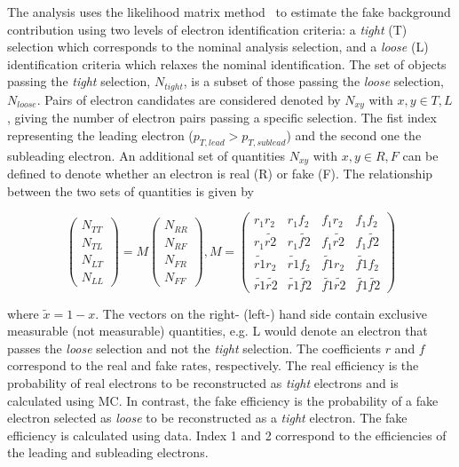 The analysis uses the likelihood matrix method~\cite{Varnes:2016nrb} to estimate the fake background contribution using two levels of electron identification criteria: a \emph{tight} (T) selection which corresponds to the nominal analysis selection, and a \emph{loose} (L) identification criteria which relaxes the nominal identification. The set of objects passing the \emph{tight} selection, $N_{tight}$, is a subset of those passing the \emph{loose} selection, $N_{loose}$. Pairs of electron candidates are considered denoted by $N_{xy}$ with $x,y \in T,L$, giving the number of electron pairs passing a specific selection. The fist index representing the leading electron ($p_{T,lead} > p_{T,sublead}$) and the second one the subleading electron. An additional set of quantities $N_{xy}$ with $x,y \in R,F$ can be defined to denote whether an electron is real (R) or fake (F). The relationship between the two sets of quantities is given by~\cite{EXOT-2016-05}

\begin{equation}\label{eq:matrix_method_1}
\left(\begin{array}{c}N_{TT}\\ N_{TL}\\ N_{LT}\\ N_{LL}\end{array}\right) = M \left(\begin{array}{c}N_{RR}\\ N_{RF}\\ N_{FR}\\ N_{FF}\end{array}\right) , M =
    \begin{pmatrix}
    r_1r_2 & r_1f_2 &  f_1r_2 & f_1f_2\\
    r_1\tilde{r2} & r_1\tilde{f2} & f_1\tilde{r2} & f_1\tilde{f2}\\
    \tilde{r1}r_2 & \tilde{r1}f_2 & \tilde{f1}r_2 & \tilde{f1}f_2\\
    \tilde{r1}\tilde{r2} & \tilde{r1}\tilde{f2} & \tilde{f1}\tilde{r2} & \tilde{f1}\tilde{f2}  
    \end{pmatrix}
\end{equation}

where $\tilde{x} = 1 - x$. The vectors on the right- (left-) hand side contain exclusive measurable (not measurable) quantities, e.g. L would denote an electron that passes the \emph{loose} selection and not the \emph{tight} selection. The coefficients $r$ and $f$ correspond to the real and fake rates, respectively. The real efficiency is the probability of real electrons to be reconstructed as \emph{tight} electrons and is calculated using MC. In contrast, the fake efficiency is the probability of a fake electron selected as \emph{loose} to be reconstructed as a \emph{tight} electron. The fake efficiency is calculated using data. Index 1 and 2 correspond to the efficiencies of the leading and subleading electrons. 

